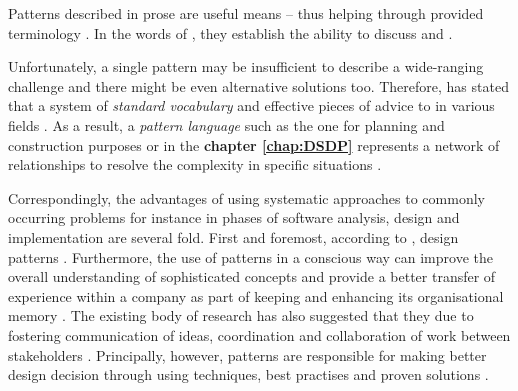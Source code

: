 Patterns described in prose are useful means  -- thus helping  through provided terminology \parencites[853]{HeffreMheer2006}[37]{Schmidt:1996:SP:236156.236164}{BruseDougals2002}.
In the words of \textcite[13]{DongPan1998TheEngine}, they establish the ability to discuss and . 

Unfortunately, a single pattern may be insufficient to describe a wide-ranging challenge and there might be even alternative solutions too.
Therefore, \textcite[37]{Schmidt:1996:SP:236156.236164} has stated that  a system of \emph{standard vocabulary} and effective pieces of advice to  in various fields \parencites[10]{Fowler2002}{InPaulPeter2016}{InventadoPeter2015}{geist2012patterns}{Wilson2008PatternsEnvironments}. 
As a result, a \emph{pattern language} such as the one for planning and construction purposes or in the \textbf{chapter \ref{chap:DSDP}} represents a network of relationships to resolve the complexity in specific situations \parencites{HeffreMheer2006}{DeardenHCI2006}.

Correspondingly, the advantages of using systematic approaches to commonly occurring problems for instance in phases of software analysis, design and implementation are several fold. 
First and foremost, according to \textcite[93]{Spinellis1999}, design patterns .
Furthermore, the use of patterns in a conscious way can improve the overall understanding of sophisticated concepts and provide a better transfer of experience within a company as part of keeping and enhancing its organisational memory \parencites{Chetan2016}{Schmidt:1996:SP:236156.236164}{DeardenHCI2006}. 
The existing body of research has also suggested that they  due to fostering communication of ideas, coordination and collaboration of work between stakeholders \parencites[1]{Adriadno2016}{Fowler2002}.  
Principally, however, patterns are responsible for making better design decision through using  techniques, best practises and proven solutions \parencite[1]{ChenHong2004}. 

